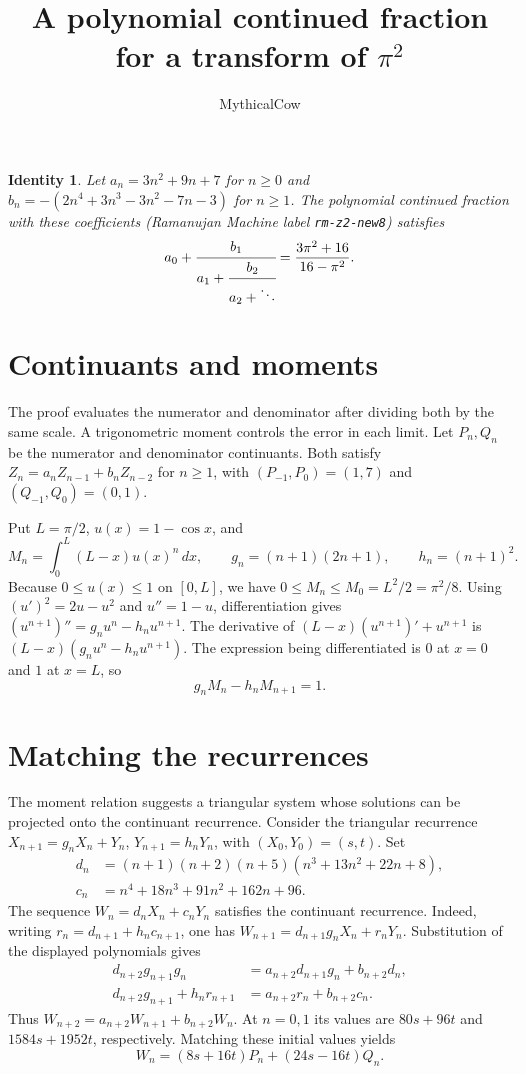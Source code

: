 \documentclass[11pt]{article}
\title{A polynomial continued fraction for a transform of \(\pi^2\)}
\author{MythicalCow}
\date{}
\newtheorem*{theorem}{Identity}
\begin{document}
\maketitle
\thispagestyle{proofguide}
\vspace{-1.5em}

\begin{theorem}
Let \(a_n=3n^2+9n+7\) for \(n\ge 0\) and
\(b_n=-(2n^4+3n^3-3n^2-7n-3)\) for \(n\ge 1\). The polynomial continued
fraction with these coefficients (Ramanujan Machine label \texttt{rm-z2-new8})
satisfies
\[
 a_0+\cfrac{b_1}{a_1+\cfrac{b_2}{a_2+\ddots}}
 =\frac{3\pi^2+16}{16-\pi^2}.
\]
\end{theorem}

\section{Continuants and moments}
The proof evaluates the numerator and denominator after dividing both by
the same scale. A trigonometric moment controls the error in each limit.
Let \(P_n,Q_n\) be the numerator and denominator continuants. Both satisfy
\(Z_n=a_nZ_{n-1}+b_nZ_{n-2}\) for \(n\ge1\), with
\((P_{-1},P_0)=(1,7)\) and \((Q_{-1},Q_0)=(0,1)\).

Put \(L=\pi/2\), \(u(x)=1-\cos x\), and
\[
 M_n=\int_0^L(L-x)u(x)^n\,dx,\qquad
 g_n=(n+1)(2n+1),\qquad h_n=(n+1)^2.
\]
Because \(0\le u(x)\le1\) on \([0,L]\), we have
\(0\le M_n\le M_0=L^2/2=\pi^2/8\). Using
\((u')^2=2u-u^2\) and \(u''=1-u\), differentiation gives
\((u^{n+1})''=g_nu^n-h_nu^{n+1}\). The derivative of
\((L-x)(u^{n+1})'+u^{n+1}\) is \((L-x)(g_nu^n-h_nu^{n+1})\).
The expression being differentiated is \(0\) at \(x=0\) and \(1\) at
\(x=L\), so
\begin{equation}\label{eq:moment}
 g_nM_n-h_nM_{n+1}=1.
\end{equation}

\section{Matching the recurrences}
The moment relation suggests a triangular system whose solutions can be
projected onto the continuant recurrence. Consider the triangular recurrence
\(X_{n+1}=g_nX_n+Y_n\), \(Y_{n+1}=h_nY_n\), with
\((X_0,Y_0)=(s,t)\). Set
\begin{align*}
 d_n&=(n+1)(n+2)(n+5)(n^3+13n^2+22n+8),\\
 c_n&=n^4+18n^3+91n^2+162n+96.
\end{align*}
The sequence \(W_n=d_nX_n+c_nY_n\) satisfies the continuant recurrence.
Indeed, writing \(r_n=d_{n+1}+h_nc_{n+1}\), one has
\(W_{n+1}=d_{n+1}g_nX_n+r_nY_n\). Substitution of the displayed
polynomials gives
\begin{align*}
 d_{n+2}g_{n+1}g_n&=a_{n+2}d_{n+1}g_n+b_{n+2}d_n,\\
 d_{n+2}g_{n+1}+h_nr_{n+1}&=a_{n+2}r_n+b_{n+2}c_n .
\end{align*}
\newpage
Thus \(W_{n+2}=a_{n+2}W_{n+1}+b_{n+2}W_n\). At \(n=0,1\) its
values are \(80s+96t\) and \(1584s+1952t\), respectively. Matching these
initial values yields
\[
 W_n=(8s+16t)P_n+(24s-16t)Q_n .
\]
\end{document}
